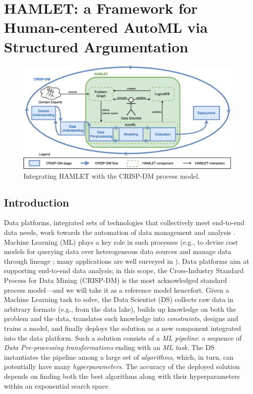 \chapter{HAMLET: a Framework for Human-centered AutoML via Structured Argumentation}
\label{human-centric-chap:hamlet}

\begin{figure}[t]
    \centering
    \includegraphics[scale=.3]{chapters/human-centric/hamlet/img/dymmymodel.png}
    \caption{Integrating HAMLET with the CRISP-DM process model.}
    \label{fig:approach}
\end{figure}

\section{Introduction}\label{intro}
Data platforms, integrated sets of technologies that collectively meet end-to-end data needs, work towards the automation of data management and analysis \cite{DBLP:journals/fgcs/FranciaGGLRS21}.
Machine Learning (ML) plays a key role in such processes (e.g., to devise cost models for querying data over heterogeneous data sources \cite{multi-store} and manage data through lineage \cite{dataplat2}; many applications are well surveyed in \cite{zhou2017ml}).
Data platforms aim at supporting end-to-end data analysis; in this scope, the Cross-Industry Standard Process for Data Mining (CRISP-DM) \cite{wirth2000crisp} is the most acknowledged standard process model---and we will take it as a reference model hencefort.
Given a Machine Learning task to solve, the Data Scientist (DS) collects raw data in arbitrary formats (e.g., from the data lake), builds up knowledge on both the problem and the data, translates such knowledge into \emph{constraints}, designs and trains a model, and finally deploys the solution as a new component integrated into the data platform.
Such a solution consists of a \emph{ML pipeline}: a sequence of \emph{Data Pre-processing transformations} ending with an \emph{ML task}.
The DS instantiates the pipeline among a large set of \emph{algorithms}, which, in turn, can potentially have many \emph{hyperparameters}.
The accuracy of the deployed solution depends on finding both the best algorithms along with their hyperparameters within an exponential search space.

